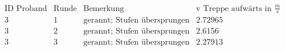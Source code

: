 \[\begin{array}{cccc}
 \text{ID Proband} & \text{Runde} & \text{Bemerkung} & \text{v Treppe aufw{\" a}rts in }\frac{m}{s} \\
 3 & 1 & \text{gerannt; Stufen {\" u}bersprungen} & 2.72965 \\
 3 & 2 & \text{gerannt; Stufen {\" u}bersprungen} & 2.6156 \\
 3 & 3 & \text{gerannt; Stufen {\" u}bersprungen} & 2.27913 \\
\end{array}\]

